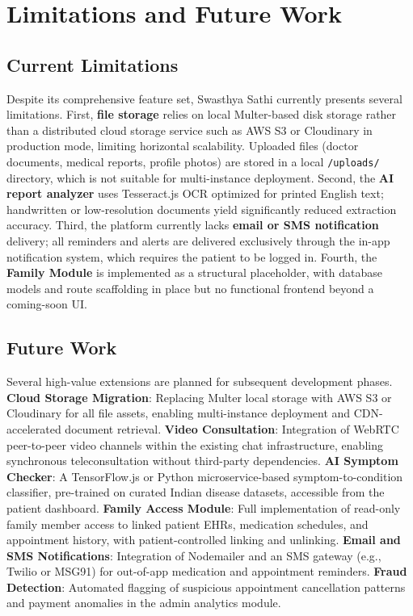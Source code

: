 \section{Limitations and Future Work}

\subsection{Current Limitations}

Despite its comprehensive feature set, Swasthya Sathi currently presents several limitations. First, \textbf{file storage} relies on local Multer-based disk storage rather than a distributed cloud storage service such as AWS S3 or Cloudinary in production mode, limiting horizontal scalability. Uploaded files (doctor documents, medical reports, profile photos) are stored in a local \texttt{/uploads/} directory, which is not suitable for multi-instance deployment. Second, the \textbf{AI report analyzer} uses Tesseract.js OCR optimized for printed English text; handwritten or low-resolution documents yield significantly reduced extraction accuracy. Third, the platform currently lacks \textbf{email or SMS notification} delivery; all reminders and alerts are delivered exclusively through the in-app notification system, which requires the patient to be logged in. Fourth, the \textbf{Family Module} is implemented as a structural placeholder, with database models and route scaffolding in place but no functional frontend beyond a coming-soon UI.

\subsection{Future Work}

Several high-value extensions are planned for subsequent development phases. \textbf{Cloud Storage Migration}: Replacing Multer local storage with AWS S3 or Cloudinary for all file assets, enabling multi-instance deployment and CDN-accelerated document retrieval. \textbf{Video Consultation}: Integration of WebRTC peer-to-peer video channels within the existing chat infrastructure, enabling synchronous teleconsultation without third-party dependencies. \textbf{AI Symptom Checker}: A TensorFlow.js or Python microservice-based symptom-to-condition classifier, pre-trained on curated Indian disease datasets, accessible from the patient dashboard. \textbf{Family Access Module}: Full implementation of read-only family member access to linked patient EHRs, medication schedules, and appointment history, with patient-controlled linking and unlinking. \textbf{Email and SMS Notifications}: Integration of Nodemailer and an SMS gateway (e.g., Twilio or MSG91) for out-of-app medication and appointment reminders. \textbf{Fraud Detection}: Automated flagging of suspicious appointment cancellation patterns and payment anomalies in the admin analytics module.

